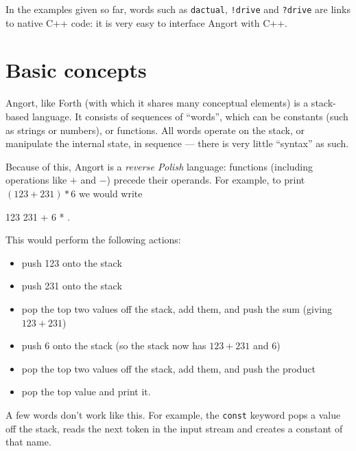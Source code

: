 In the examples given so far, words such as \texttt{dactual},
\texttt{!drive} and \texttt{?drive} are links to native C++ code: it
is very easy to interface Angort with C++.

\section{Basic concepts}
Angort, like Forth (with which it shares many conceptual elements)
is a stack-based language. It consists of sequences of ``words'',
which can be constants (such as strings or numbers), or functions.
All words operate on the stack, or manipulate the internal state,
in sequence --- there is very little ``syntax'' as such.

Because of this, Angort is a \emph{reverse Polish} language: functions
(including operations like $+$ and $-$) precede their operands. For
example, to print $(123+231)*6$ we would write
\begin{v}
123 231 + 6 * .
\end{v}
This would perform the following actions:
\begin{itemize}
\item push 123 onto the stack
\item push 231 onto the stack
\item pop the top two values off the stack, add them, and push the sum (giving $123+231$)
\item push 6 onto the stack (so the stack now has $123+231$ and $6$)
\item pop the top two values off the stack, add them, and push the product
\item pop the top value and print it.
\end{itemize}
A few words don't work like this. For example, the \texttt{const} keyword
pops a value off the stack, reads the next token in the input stream and
creates a constant of that name. 


